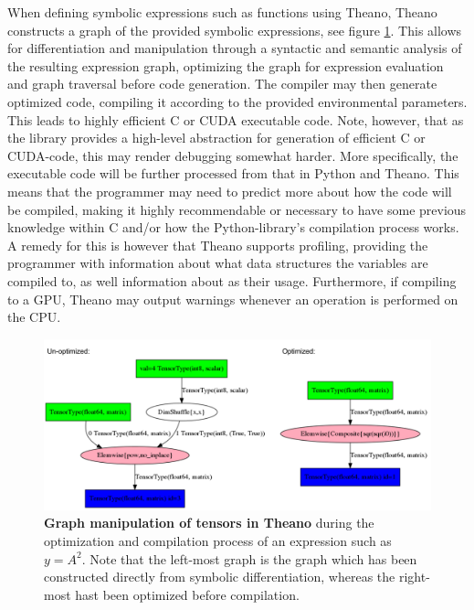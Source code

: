 When defining symbolic expressions such as functions using Theano, Theano constructs a graph of the provided symbolic expressions, see figure \ref{fig:theano_graph_demo}. This allows for differentiation and manipulation through a syntactic and semantic analysis of the resulting expression graph, optimizing the graph for expression evaluation and graph traversal before code generation. The compiler may then generate optimized code, compiling it according to the provided environmental parameters. This leads to highly efficient C or CUDA executable code.
Note, however, that as the library provides a high-level abstraction for generation of efficient C or CUDA-code, this may render debugging somewhat harder. More specifically, the executable code will be further processed from that in Python and Theano. This means that the programmer may need to predict more about how the code will be compiled, making it highly recommendable or necessary to have some previous knowledge within C and/or how the Python-library's compilation process works. A remedy for this is however that Theano supports profiling, providing the programmer with information about what data structures the variables are compiled to, as well information about as their usage. Furthermore, if compiling to a GPU, Theano may output warnings whenever an operation is performed on the CPU.

\begin{figure}
\centering
\includegraphics[width=12cm]{fig/unopt_opt_theano_graph}
\caption{\textbf{Graph manipulation of tensors in Theano} during the optimization and compilation process of an expression such as $y = A^2$. Note that the left-most graph is the graph which has been constructed directly from symbolic differentiation, whereas the right-most hast been optimized before compilation.}
\label{fig:theano_graph_demo}
\end{figure}

